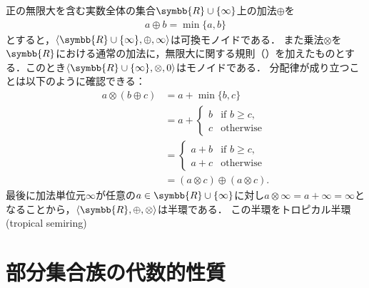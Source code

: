 \documentclass[../main.tex]{subfiles}
\begin{document}
\begin{example} 正の無限大を含む実数全体の集合\(\symbb{R} \cup \{\infty\}\)上の加法\(\oplus\)を
\begin{align*}
    a \oplus b = \min \{a, b\}
\end{align*}
とすると，\(\langle \symbb{R} \cup \{\infty\}, \oplus, \infty\rangle\)は可換モノイドである．
また乗法\(\otimes\)を\(\symbb{R}\)における通常の加法に，無限大に関する規則（）を加えたものとする．このとき\(\langle \symbb{R} \cup \{\infty\}, \mathord{\otimes}, 0 \rangle\)はモノイドである．
分配律が成り立つことは以下のように確認できる：
\begin{align*}
    a \otimes (b \oplus c)
    &= a + \min \{b, c\} \\
    &= a +
    \begin{cases}
        b & \text{if \(b \geq c\),} \\
        c & \text{otherwise}
    \end{cases} \\
    &=
    \begin{cases}
        a + b  & \text{if \(b \geq c\),} \\
        a + c & \text{otherwise}
    \end{cases} \\
    &= (a \otimes c) \oplus (a \otimes c).
\end{align*}
最後に加法単位元\(\infty\)が任意の\(a \in \symbb{R} \cup \{\infty\}\)に対し\(a \otimes \infty = a + \infty = \infty\)となることから，\(\langle \symbb{R}, \mathord{\oplus}, \mathord{\otimes}\rangle\)は半環である．
    この半環をトロピカル半環(tropical semiring)
\end{example}

\begin{thmbox}
\begin{definition}[（ベクトル空間）]
\end{definition}
\end{thmbox}

\begin{thmbox}
\begin{definition}[（代数）]
\end{definition}
\end{thmbox}

\section{部分集合族の代数的性質}
\end{document}

